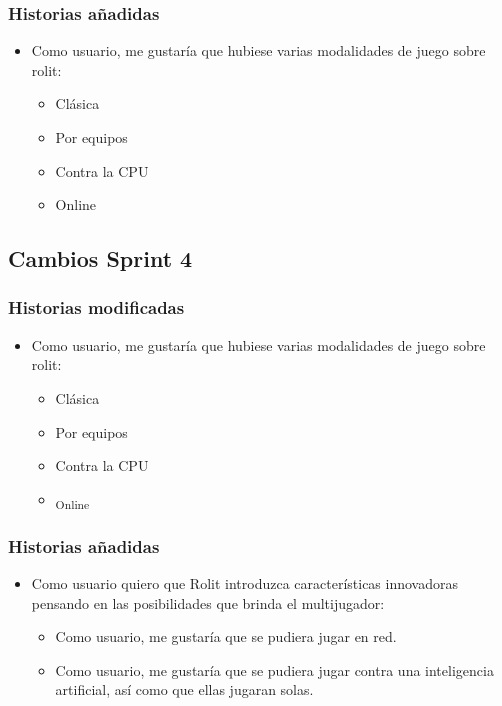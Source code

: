 \documentclass[../../FINAL/Scrum/SCRUM.tex]{subfiles}
\begin{document}
\subsubsection*{Historias añadidas}
\begin{itemize}
\item
  Como usuario, me gustaría que hubiese varias modalidades de juego
  sobre rolit:

  \begin{itemize}
  \item
    Clásica
  \item
    Por equipos
  \item
    Contra la CPU
  \item
    Online
  \end{itemize}
\end{itemize}

\subsection{Cambios Sprint 4}

\subsubsection*{Historias modificadas}
\begin{itemize}
\item
  Como usuario, me gustaría que hubiese varias modalidades de juego
  sobre rolit:

  \begin{itemize}
  \item
    Clásica
  \item
    Por equipos
  \item
     Contra la CPU
  \item
    \textsubscript{Online}
  \end{itemize}
\end{itemize}

\subsubsection*{Historias añadidas}
\begin{itemize}
\item
  Como usuario quiero que Rolit introduzca características innovadoras
  pensando en las posibilidades que brinda el multijugador:

  \begin{itemize}
  \item
    Como usuario, me gustaría que se pudiera jugar en red.
  \item
    Como usuario, me gustaría que se pudiera jugar contra una
    inteligencia artificial, así como que ellas jugaran solas.
  \end{itemize}
\end{itemize}
\end{document}
